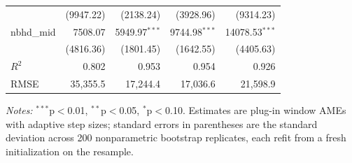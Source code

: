 \begin{table}[htbp]
\begin{threeparttable}
\begin{tabular}{lrrrr}
 & (9947.22) & (2138.24) & (3928.96) & (9314.23) \\
nbhd\_mid & 7508.07 & 5949.97$^{***}$ & 9744.98$^{***}$ & 14078.53$^{***}$ \\
 & (4816.36) & (1801.45) & (1642.55) & (4405.63) \\
\midrule
$R^2$ & 0.802 & 0.953 & 0.954 & 0.926 \\
RMSE & 35,355.5 & 17,244.4 & 17,036.6 & 21,598.9 \\
\bottomrule
\end{tabular}
\begin{tablenotes}
\footnotesize
\item \textit{Notes:} $^{***}$p$<$0.01, $^{**}$p$<$0.05, $^{*}$p$<$0.10. Estimates are plug-in window AMEs with adaptive step sizes; standard errors in parentheses are the standard deviation across 200 nonparametric bootstrap replicates, each refit from a fresh initialization on the resample.
\end{tablenotes}
\end{threeparttable}
\end{table}